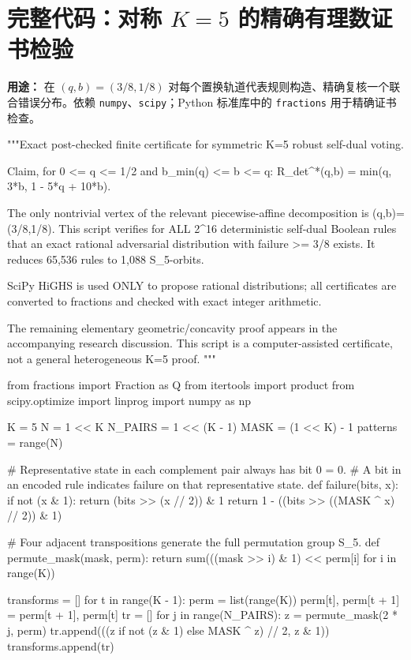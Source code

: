 \documentclass[11pt,a4paper]{ctexart}
\theoremstyle{definition}
\begin{document}
\appendix
\section{完整代码：对称 $K=5$ 的精确有理数证书检验}
\noindent\textbf{用途：} 在 $(q,b)=(3/8,1/8)$ 对每个置换轨道代表规则构造、精确复核一个联合错误分布。依赖 \texttt{numpy}、\texttt{scipy}；Python 标准库中的 \texttt{fractions} 用于精确证书检查。

\begin{CodeListing}
"""Exact post-checked finite certificate for symmetric K=5 robust self-dual voting.

Claim, for 0 <= q <= 1/2 and b_min(q) <= b <= q:
    R_det^*(q,b) = min(q, 3*b, 1 - 5*q + 10*b).

The only nontrivial vertex of the relevant piecewise-affine decomposition
is (q,b)=(3/8,1/8).  This script verifies for ALL 2^16 deterministic
self-dual Boolean rules that an exact rational adversarial distribution
with failure >= 3/8 exists.  It reduces 65,536 rules to 1,088 S_5-orbits.

SciPy HiGHS is used ONLY to propose rational distributions; all certificates
are converted to fractions and checked with exact integer arithmetic.

The remaining elementary geometric/concavity proof appears in the
accompanying research discussion.  This script is a computer-assisted
certificate, not a general heterogeneous K=5 proof.
"""

from fractions import Fraction as Q
from itertools import product
from scipy.optimize import linprog
import numpy as np

K = 5
N = 1 << K
N_PAIRS = 1 << (K - 1)
MASK = (1 << K) - 1
patterns = range(N)

# Representative state in each complement pair always has bit 0 = 0.
# A bit in an encoded rule indicates failure on that representative state.
def failure(bits, x):
    if not (x & 1):
        return (bits >> (x // 2)) & 1
    return 1 - ((bits >> ((MASK ^ x) // 2)) & 1)

# Four adjacent transpositions generate the full permutation group S_5.
def permute_mask(mask, perm):
    return sum(((mask >> i) & 1) << perm[i] for i in range(K))

transforms = []
for t in range(K - 1):
    perm = list(range(K))
    perm[t], perm[t + 1] = perm[t + 1], perm[t]
    tr = []
    for j in range(N_PAIRS):
        z = permute_mask(2 * j, perm)
        tr.append(((z if not (z & 1) else MASK ^ z) // 2, z & 1))
    transforms.append(tr)


\end{CodeListing}
\end{document}
